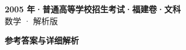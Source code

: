 \documentclass[zihao=-4, a4paper]{ctexart}
\begin{document}
\begin{center}
  {\Large\bfseries 2005 年·普通高等学校招生考试·福建卷·文科}\\[4pt]
  {\large 数学 · 解析版}
\end{center}
\medskip
{}

\clearpage
{}
\begin{center}{\Large\bfseries 参考答案与详细解析}\end{center}
\medskip

\end{document}
